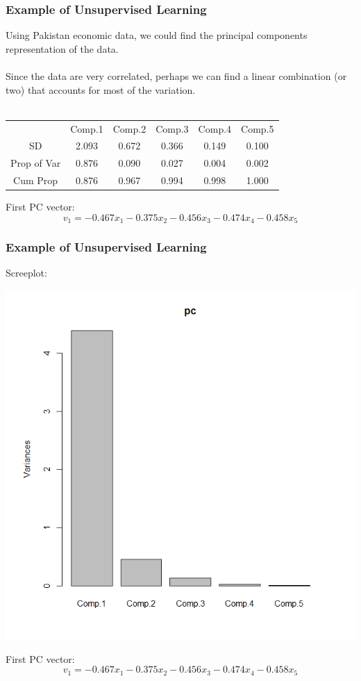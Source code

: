 \documentclass[hide notes,red,handout]{beamer}
\begin{document}
\begin{frame}[t]
\frametitle{Example of Unsupervised Learning}
Using Pakistan economic data, we could find the principal components representation of the data.\\~\\
Since the data are very correlated, perhaps we can find a linear combination (or two) that accounts for most of the variation.\\~\\\pause
\begin{center}
\begin{tabular}{c|ccccc}
                    &      Comp.1 &    Comp.2  &   Comp.3   &   Comp.4    &   Comp.5\\
SD         & 2.093& 0.672& 0.366& 0.149& 0.100\\
Prop of Var& 0.876& 0.090& 0.027& 0.004& 0.002\\
Cum Prop   &0.876& 0.967& 0.994& 0.998& 1.000
\end{tabular}
\end{center}
First PC vector:
$$v_1=-0.467x_1 -0.375x_2 -0.456x_3 -0.474x_4 -0.458x_5 $$
\end{frame}

\begin{frame}[t]
\frametitle{Example of Unsupervised Learning}
Screeplot:
\begin{center}
\includegraphics[scale=0.3]{screeplot}
\end{center}
First PC vector:
$$v_1=-0.467x_1 -0.375x_2 -0.456x_3 -0.474x_4 -0.458x_5 $$
\end{frame}
\end{document}

